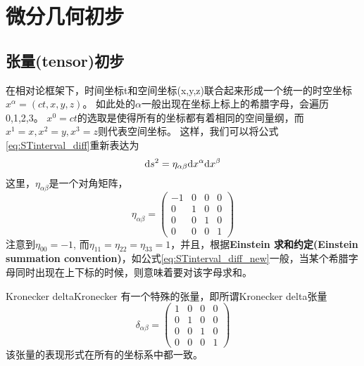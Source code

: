 \section{微分几何初步}
\subsection{张量(tensor)初步}\label{sec:tensor}
在相对论框架下，时间坐标t和空间坐标(x,y,z)联合起来形成一个统一的时空坐标
$x^{\alpha} = (ct,x,y,z)$。
如此处的$\alpha$一般出现在坐标上标上的希腊字母，会遍历{0,1,2,3}。
$x^0= ct$的选取是使得所有的坐标都有着相同的空间量纲，而$x^1 =x, x^2 = y, x^3 = z$则代表空间坐标。
这样，我们可以将公式\ref{eq:STinterval_diff}重新表达为
\begin{equation}\label{eq:STinterval_diff_new}
  {\rm d}s^2 = \eta_ {\alpha \beta}{\rm d}x^\alpha {\rm d} x^\beta
\end{equation}
这里，$\eta_ {\alpha \beta}$是一个对角矩阵，
\begin{equation}\label{eq:Minkowski}
  \eta_{\alpha\beta} ={\begin{pmatrix}
                       -1 & 0 & 0 & 0\\
                        0 & 1 & 0 & 0\\ 
                        0 & 0 & 1 & 0\\
                        0 & 0 & 0 & 1\end{pmatrix}}
\end{equation}
注意到$\eta_{00} = -1$, 而$\eta_{11} = \eta_{22} = \eta_{33} = 1$，并且，根据{\textbf{Einstein 求和约定(Einstein summation convention)}}，如公式\ref{eq:STinterval_diff_new}一般，当某个希腊字母同时出现在上下标的时候，则意味着要对该字母求和。


\begin{myprop}{Kronecker delta}{Kronecker}
  有一个特殊的张量，即所谓Kronecker delta张量
\begin{equation}\label{eq:Kronecker}
  \delta_{\alpha\beta} ={\begin{pmatrix}
                        1 & 0 & 0 & 0\\
                        0 & 1 & 0 & 0\\ 
                        0 & 0 & 1 & 0\\
                        0 & 0 & 0 & 1\end{pmatrix}}
\end{equation}
  该张量的表现形式在所有的坐标系中都一致。
\end{myprop}


